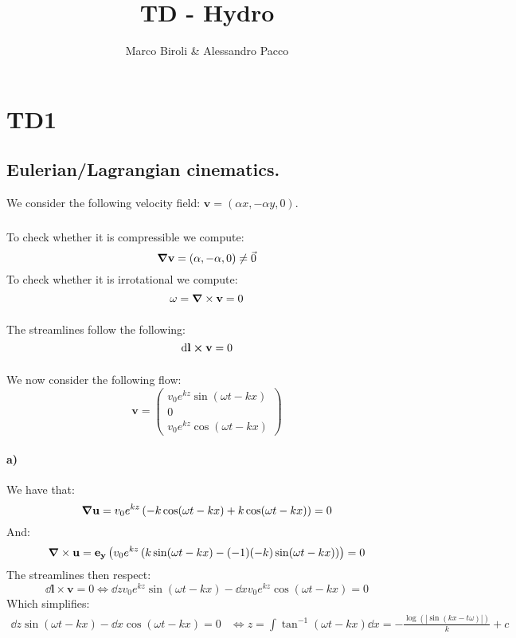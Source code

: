 \documentclass[10pt,a4paper]{book}
\author{Marco Biroli & Alessandro Pacco}
\title{TD - Hydro}
\begin{document}
\chapter{TD1}
\section{Eulerian/Lagrangian cinematics.}
We consider the following velocity field: $\mathbf{v} = (\alpha x, - \alpha y, 0)$. 
\subsection{}
To check whether it is compressible we compute:
\[
\grad \mathbf{v} = (\alpha, - \alpha, 0) \neq \vec{0}
\]
To check whether it is irrotational we compute:
\[
\omega = \grad \times \mathbf{v} = 0
\]
\subsection{}
The streamlines follow the following:
\[
\dd \mathbf{l} \cross \mathbf{v} = 0
\]

\subsection{}
\subsection{}

\subsection{}
We now consider the following flow:
\[
\mathbf{v} = \begin{pmatrix}
v_0 e^{kz}\sin(\omega t - kx)\\
0\\
v_0 e^{kz} \cos(\omega t - k x)
\end{pmatrix}
\]
\subsubsection{a)}
We have that:
\[
\grad \mathbf{u} = v_0 e^{kz}\left(- k \cos(\omega t - k x) + k \cos(\omega t  - k x)\right) = 0
\]
And:
\[
\grad \times \mathbf{u} = \mathbf{e_y} \left( v_0 e^{kz}\left( k \sin(\omega t - k x) - (- 1)(- k)\sin(\omega t  - k x) \right) \right) = 0
\]
The streamlines then respect:
\[
\dd \mathbf{l} \times \mathbf{v} = 0 \Leftrightarrow \dd z v_0 e^{kz} \sin(\omega t - k x) - \dd x v_0 e^{kz} \cos(\omega t - k x) = 0
\]
Which simplifies:
\begin{align*}
\dd z \sin(\omega t - kx) - \dd x \cos(\omega t - k x) = 0 &\Leftrightarrow z = \int \tan^{-1}(\omega t - k x) \dd x = -\frac{\log(| \sin (k x - t \omega)|)}{k} + c 
\end{align*}
\end{document}
